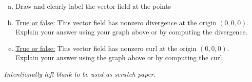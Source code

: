 \documentclass[12pt]{amsbook}
\begin{document}
\begin{enumerate}[(a)]
    \item Draw and clearly label the vector field at the points 
    \begin{Parallel}{0.45\textwidth}{0.45\textwidth}
\ParallelPar
\end{Parallel}
    \begin{center}
    \end{center}
    
    \item \underline{True or false:} This vector field has nonzero divergence at the origin $(0,0,0)$. Explain your answer using your graph above or by computing the divergence.
    \vspace*{4cm}
    \item \underline{True or false:} This vector field has nonzero curl at the origin $(0,0,0)$. Explain your answer using the graph above or by computing the curl.
\end{enumerate}

\newpage
\emph{Intentionally left blank to be used as scratch paper.}\\















\newpage
\end{document}
